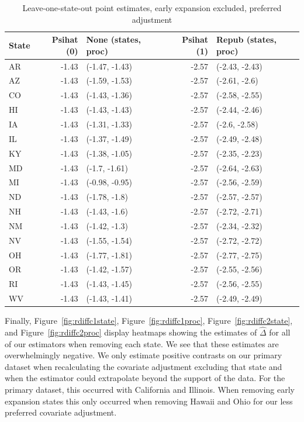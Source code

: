 \documentclass[aoas]{imsart}
\theoremstyle{plain}
\theoremstyle{remark}
\begin{document}
\begin{appendix}
\begin{table}[ht]
\centering
   \caption{Leave-one-state-out point estimates, early expansion excluded, preferred adjustment}
    \label{tab:loostatec2}
\begin{tabular}{lrlrl}
  \hline
State & Psihat (0) & None (states, proc) & Psihat (1) & Repub (states, proc) \\ 
  \hline
AR & -1.43 & (-1.47, -1.43) & -2.57 & (-2.43, -2.43) \\ 
  AZ & -1.43 & (-1.59, -1.53) & -2.57 & (-2.61, -2.6) \\ 
  CO & -1.43 & (-1.43, -1.36) & -2.57 & (-2.58, -2.55) \\ 
  HI & -1.43 & (-1.43, -1.43) & -2.57 & (-2.44, -2.46) \\ 
  IA & -1.43 & (-1.31, -1.33) & -2.57 & (-2.6, -2.58) \\ 
  IL & -1.43 & (-1.37, -1.49) & -2.57 & (-2.49, -2.48) \\ 
  KY & -1.43 & (-1.38, -1.05) & -2.57 & (-2.35, -2.23) \\ 
  MD & -1.43 & (-1.7, -1.61) & -2.57 & (-2.64, -2.63) \\ 
  MI & -1.43 & (-0.98, -0.95) & -2.57 & (-2.56, -2.59) \\ 
  ND & -1.43 & (-1.78, -1.8) & -2.57 & (-2.57, -2.57) \\ 
  NH & -1.43 & (-1.43, -1.6) & -2.57 & (-2.72, -2.71) \\ 
  NM & -1.43 & (-1.42, -1.3) & -2.57 & (-2.34, -2.32) \\ 
  NV & -1.43 & (-1.55, -1.54) & -2.57 & (-2.72, -2.72) \\ 
  OH & -1.43 & (-1.77, -1.81) & -2.57 & (-2.77, -2.75) \\ 
  OR & -1.43 & (-1.42, -1.57) & -2.57 & (-2.55, -2.56) \\ 
  RI & -1.43 & (-1.43, -1.45) & -2.57 & (-2.56, -2.55) \\ 
  WV & -1.43 & (-1.43, -1.41) & -2.57 & (-2.49, -2.49) \\ 
   \hline
\end{tabular}
\end{table}

Finally, Figure~\ref{fig:rdiffc1state}, Figure~\ref{fig:rdiffc1proc}, Figure~\ref{fig:rdiffc2state}, and Figure~\ref{fig:rdiffc2proc} display heatmaps showing the estimates of $\hat{\Delta}$ for all of our estimators when removing each state. We see that these estimates are overwhelmingly negative. We only estimate positive contrasts on our primary dataset when recalculating the covariate adjustment excluding that state and when the estimator could extrapolate beyond the support of the data. For the primary dataset, this occurred with California and Illinois. When removing early expansion states this only occurred when removing Hawaii and Ohio for our less preferred covariate adjustment.


\end{appendix}
\end{document}
